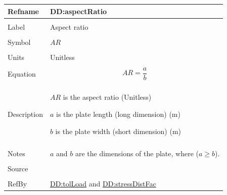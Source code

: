 \documentclass[12pt]{article}
\begin{document}
\vspace{\baselineskip}
\noindent
\begin{minipage}{\textwidth}
\begin{tabular}{>{\raggedright}p{}>{\raggedright\arraybackslash}p{}}
\toprule \textbf{Refname} & \textbf{DD:aspectRatio}
\label{DD:aspectRatio}
\\ \midrule \\
Label & Aspect ratio
        
\\ \midrule \\
Symbol & $\mathit{AR}$
         
\\ \midrule \\
Units & Unitless
        
\\ \midrule \\
Equation & \begin{displaymath}
           \mathit{AR}=\frac{a}{b}
           \end{displaymath}
\\ \midrule \\
Description & \begin{symbDescription}
              \item{$\mathit{AR}$ is the aspect ratio (Unitless)}
              \item{$a$ is the plate length (long dimension) (${\text{m}}$)}
              \item{$b$ is the plate width (short dimension) (${\text{m}}$)}
              \end{symbDescription}
\\ \midrule \\
Notes & $a$ and $b$ are the dimensions of the plate, where ($a\geq{}b$).
        
\\ \midrule \\
Source & \cite{astm2009}
         
\\ \midrule \\
RefBy & \hyperref[DD:tolLoad]{DD:tolLoad} and \hyperref[DD:stressDistFac]{DD:stressDistFac}
        
\\ \bottomrule
\end{tabular}
\end{minipage}
\end{document}
